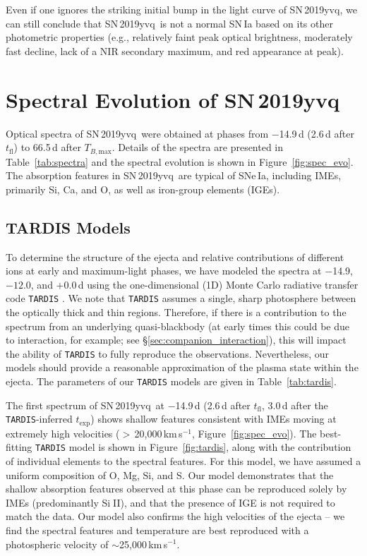 \documentclass[twocolumn]{aastex63}
\def\ion#1#2{#1$\;${\footnotesize\rm{#2}}\relax}
\newcommand{\tfl}{$t_\mathrm{fl}$}
\newcommand{\tbmax}{$T_{B,\mathrm{max}}$}
\newcommand{\kms}{km\,s$^{-1}$}
\newcommand{\sn}{SN\,2019yvq}
\begin{document}
Even if one ignores the striking initial bump in the light curve of \sn, we
can still conclude that \sn\ is not a normal SN\,Ia based on its other
photometric properties (e.g., relatively faint peak optical brightness,
moderately fast decline, lack of a NIR secondary maximum, and red appearance
at peak).

\section{Spectral Evolution of \sn}\label{sec:spec}

Optical spectra of \sn\ were obtained at phases from $-$14.9\,d (2.6\,d after
\tfl) to 66.5\,d after \tbmax. Details of the spectra are presented in
Table~\ref{tab:spectra} and the spectral evolution is shown in
Figure~\ref{fig:spec_evo}. The absorption features in \sn\ are typical of
SNe\,Ia, including IMEs, primarily Si, Ca, and O, as well as iron-group
elements (IGEs).



\subsection{TARDIS Models}\label{sec:tardis}

To determine the structure of the ejecta and relative contributions of
different ions at early and maximum-light phases, we have modeled the spectra
at $-$14.9, $-12.0$, and $+$0.0\,d using the one-dimensional (1D) Monte Carlo
radiative transfer code \texttt{TARDIS} \citep{Kerzendorf14}. We note that
\texttt{TARDIS} assumes a single, sharp photosphere between the optically
thick and thin regions. Therefore, if there is a contribution to the spectrum
from an underlying quasi-blackbody (at early times this could be due to
interaction, for example; see \S\ref{sec:companion_interaction}), this will
impact the ability of \texttt{TARDIS} to fully reproduce the observations.
Nevertheless, our models should provide a reasonable approximation of the
plasma state within the ejecta. The parameters of our \texttt{TARDIS} models
are given in Table~\ref{tab:tardis}.

The first spectrum of \sn\ at $-$14.9\,d (2.6\,d after \tfl, 3.0\,d after the
\texttt{TARDIS}-inferred $t_\mathrm{exp}$) shows shallow features consistent
with IMEs moving at extremely high velocities ($>$\,20,000\,\kms,
Figure~\ref{fig:spec_evo}). The best-fitting \texttt{TARDIS} model is shown in
Figure~\ref{fig:tardis}, along with the contribution of individual elements to
the spectral features. For this model, we have assumed a uniform composition
of O, Mg, Si, and S. Our model demonstrates that the shallow absorption
features observed at this phase can be reproduced solely by IMEs
(predominantly \ion{Si}{II}), and that the presence of IGE is not required to
match the data. Our model also confirms the high velocities of the ejecta --
we find the spectral features and temperature are best reproduced with a
photospheric velocity of $\sim$25,000\,\kms.
\end{document}
